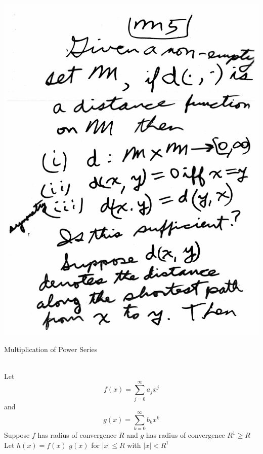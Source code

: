 \documentclass[10pt,a4paper]{article}
\begin{document}
{{\\\includegraphics[scale=0.5]{Pages/MetricSpace1_5.pdf}
\pagebreak
\begin{large}Multiplication of Power Series
\end{large}
\\Let $$f(x)=\sum_{j=0}^{\infty} a_{j} x^{j}$$ and $$g(x)=\sum_{k=0}^{\infty} b_{k} x^{k}$$ Suppose $f$ has radius of convergence $R$ and $g$ has radius of convergence $R^{1} \geq R$ Let $h(x)=f(x)$ $g(x)$ for $|x|\leq R$ with $|x|<R^{1}$
}}
\end{document}
